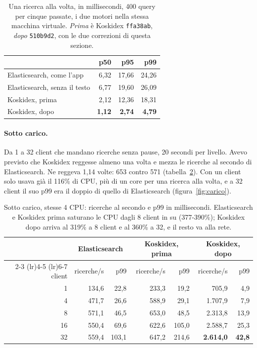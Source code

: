 \begin{table}[ht]
  \centering
  \begin{tabular}{lrrr}
    \toprule
    & p50 & p95 & p99 \\
    \midrule
    Elasticsearch, come l'app & 6,32 & 17,66 & 24,26 \\
    Elasticsearch, senza il testo & 6,77 & 19,60 & 26,09 \\
    Koskidex, prima & 2,12 & 12,36 & 18,31 \\
    Koskidex, dopo & \textbf{1,12} & \textbf{2,74} & \textbf{4,79} \\
    \bottomrule
  \end{tabular}
  \caption{Una ricerca alla volta, in millisecondi, 400 query per cinque
  passate, i due motori nella stessa macchina virtuale. \emph{Prima} è
  Koskidex \texttt{ffa38ab}, \emph{dopo} \texttt{510b9d2}, con le due correzioni
  di questa sezione.}
  \label{tab:carico-sequenziale}
\end{table}

\paragraph{Sotto carico.} Da 1 a 32 client che mandano ricerche senza pause,
20 secondi per livello. Avevo previsto che Koskidex reggesse almeno una volta e
mezza le ricerche al secondo di Elasticsearch. Ne reggeva 1,14 volte: 653
contro 571 (tabella~\ref{tab:carico}). Con un client solo usava già il 116\% di
CPU, più di un core per una ricerca alla volta, e a 32 client il suo p99 era il
doppio di quello di Elasticsearch (figura~\ref{fig:carico}).



\begin{table}[ht]
  \centering
  \begin{tabular}{rrrrrrr}
    \toprule
    & \multicolumn{2}{c}{Elasticsearch} & \multicolumn{2}{c}{Koskidex, prima} &
    \multicolumn{2}{c}{Koskidex, dopo} \\
    \cmidrule(lr){2-3} \cmidrule(lr){4-5} \cmidrule(lr){6-7}
    client & ricerche/s & p99 & ricerche/s & p99 & ricerche/s & p99 \\
    \midrule
    1 & 134,6 & 22,8 & 233,3 & 19,2 & 705,9 & 4,9 \\
    4 & 471,7 & 26,6 & 588,9 & 29,1 & 1.707,9 & 7,9 \\
    8 & 571,1 & 46,5 & 653,0 & 48,5 & 2.313,8 & 13,9 \\
    16 & 550,4 & 69,6 & 622,6 & 105,0 & 2.588,7 & 25,3 \\
    32 & 559,4 & 103,1 & 647,2 & 214,6 & \textbf{2.614,0} & \textbf{42,8} \\
    \bottomrule
  \end{tabular}
  \caption{Sotto carico, stesse 4 CPU: ricerche al secondo e p99 in
  millisecondi. Elasticsearch e Koskidex prima saturano le CPU dagli 8 client
  in su (377-390\%); Koskidex dopo arriva al 319\% a 8 client e al 360\% a
  32, e il resto va alla rete.}
  \label{tab:carico}
\end{table}

